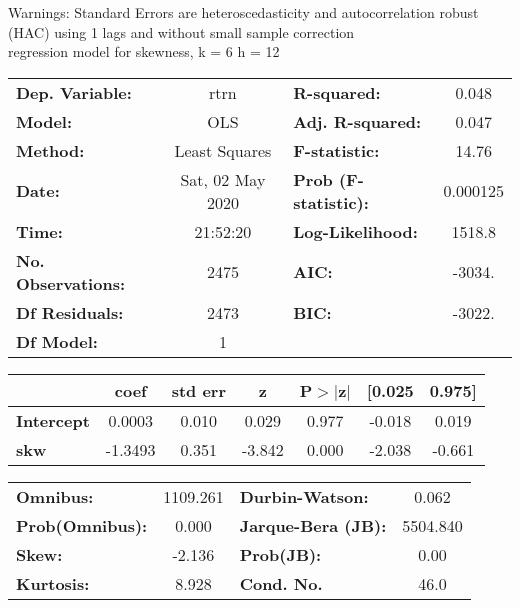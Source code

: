 Warnings: \newline
 [1] Standard Errors are heteroscedasticity and autocorrelation robust (HAC) using 1 lags and without small sample correction\\ 

regression model for skewness, k = 6 h = 12\begin{center}
\begin{tabular}{lclc}
\toprule
\textbf{Dep. Variable:}    &       rtrn       & \textbf{  R-squared:         } &     0.048   \\
\textbf{Model:}            &       OLS        & \textbf{  Adj. R-squared:    } &     0.047   \\
\textbf{Method:}           &  Least Squares   & \textbf{  F-statistic:       } &     14.76   \\
\textbf{Date:}             & Sat, 02 May 2020 & \textbf{  Prob (F-statistic):} &  0.000125   \\
\textbf{Time:}             &     21:52:20     & \textbf{  Log-Likelihood:    } &    1518.8   \\
\textbf{No. Observations:} &        2475      & \textbf{  AIC:               } &    -3034.   \\
\textbf{Df Residuals:}     &        2473      & \textbf{  BIC:               } &    -3022.   \\
\textbf{Df Model:}         &           1      & \textbf{                     } &             \\
\bottomrule
\end{tabular}
\begin{tabular}{lcccccc}
                   & \textbf{coef} & \textbf{std err} & \textbf{z} & \textbf{P$> |$z$|$} & \textbf{[0.025} & \textbf{0.975]}  \\
\midrule
\textbf{Intercept} &       0.0003  &        0.010     &     0.029  &         0.977        &       -0.018    &        0.019     \\
\textbf{skw}       &      -1.3493  &        0.351     &    -3.842  &         0.000        &       -2.038    &       -0.661     \\
\bottomrule
\end{tabular}
\begin{tabular}{lclc}
\textbf{Omnibus:}       & 1109.261 & \textbf{  Durbin-Watson:     } &    0.062  \\
\textbf{Prob(Omnibus):} &   0.000  & \textbf{  Jarque-Bera (JB):  } & 5504.840  \\
\textbf{Skew:}          &  -2.136  & \textbf{  Prob(JB):          } &     0.00  \\
\textbf{Kurtosis:}      &   8.928  & \textbf{  Cond. No.          } &     46.0  \\
\bottomrule
\end{tabular}
\end{center}

